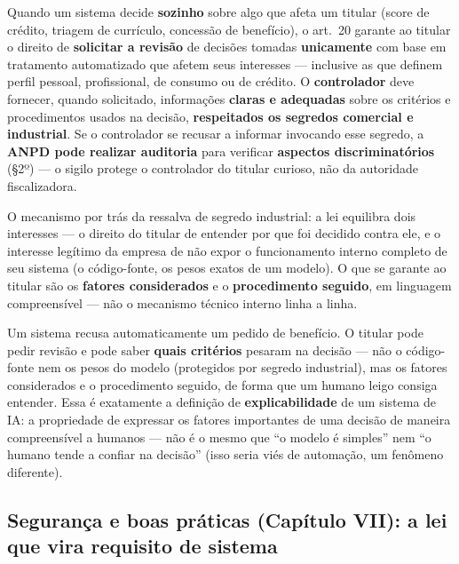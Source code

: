 \begin{conceito}
Quando um sistema decide \textbf{sozinho} sobre algo que afeta um
titular (score de crédito, triagem de currículo, concessão de benefício),
o art.\ 20 garante ao titular o direito de \textbf{solicitar a revisão} de
decisões tomadas \textbf{unicamente} com base em tratamento automatizado
que afetem seus interesses --- inclusive as que definem perfil pessoal,
profissional, de consumo ou de crédito. O \textbf{controlador} deve
fornecer, quando solicitado, informações \textbf{claras e adequadas} sobre
os critérios e procedimentos usados na decisão, \textbf{respeitados os
segredos comercial e industrial}. Se o controlador se recusar a informar
invocando esse segredo, a \textbf{ANPD pode realizar auditoria} para
verificar \textbf{aspectos discriminatórios} (§2º) --- o sigilo protege o
controlador do titular curioso, não da autoridade fiscalizadora.

O mecanismo por trás da ressalva de segredo industrial: a lei equilibra
dois interesses --- o direito do titular de entender por que foi
decidido contra ele, e o interesse legítimo da empresa de não expor o
funcionamento interno completo de seu sistema (o código-fonte, os pesos
exatos de um modelo). O que se garante ao titular são os \textbf{fatores
considerados} e o \textbf{procedimento seguido}, em linguagem
compreensível --- não o mecanismo técnico interno linha a linha.
\end{conceito}

\begin{exemplo}
Um sistema recusa automaticamente um pedido de benefício. O titular pode
pedir revisão e pode saber \textbf{quais critérios} pesaram na decisão ---
não o código-fonte nem os pesos do modelo (protegidos por segredo
industrial), mas os fatores considerados e o procedimento seguido, de
forma que um humano leigo consiga entender. Essa é exatamente a definição
de \textbf{explicabilidade} de um sistema de IA: a propriedade de expressar
os fatores importantes de uma decisão de maneira compreensível a humanos
--- não é o mesmo que “o modelo é simples” nem “o humano tende a confiar
na decisão” (isso seria viés de automação, um fenômeno diferente).
\end{exemplo}

\subsection{Segurança e boas práticas (Capítulo VII): a lei que vira requisito de sistema}

